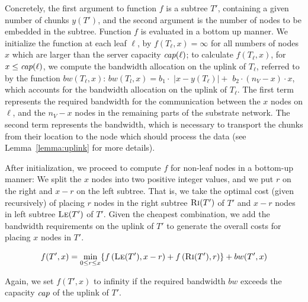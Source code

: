 \documentclass[conference,10pt]{IEEEtran}
\newcommand{\ChunkCount}{\ensuremath{y}}
\newcommand{\capacity}{\emph{cap}}
\newcommand{\Tree}{\ensuremath{T}}
\newcommand{\CostTrans}{\ensuremath{b_1}}
\newcommand{\CostCom}{\ensuremath{b_2}}
\newcommand{\Vms}{\ensuremath{n_V}}
\begin{document}
Concretely, the first argument to function $f$
is a subtree $\Tree'$, containing a given number of
chunks $\ChunkCount(\Tree')$,
and the
second argument is the number of nodes to be embedded in the subtree.
Function $f$ is evaluated in a bottom up manner. We initialize the
function at each leaf $\ell$, by $f(T_{\ell},x) =
\infty$ for all numbers of nodes $x$ which are larger than
the server capacity $\capacity(\ell)$;
to calculate $f(T_{\ell}, x)$, for $x \leq \capacity(\ell)$, we compute the
bandwidth allocation on the uplink of $T_{\ell}$, referred to by the function
$bw(T_{\ell},x)$:
$bw(T_l,x)=  \CostTrans \cdot $ $|x - \ChunkCount(T_{\ell})| +$ $ \CostCom \cdot
(\Vms - x) \cdot x$,
which accounts for the bandwidth allocation on the uplink of $T_{\ell}$. The
first
term represents the required bandwidth for the communication between the $x$
nodes on $\ell$, and the $\Vms - x$ nodes in the remaining parts of the substrate
network.
The second term represents
the bandwidth, which is necessary to transport the chunks from their location to
the node which should process the data (see Lemma~\ref{lemma:uplink} for more
details).

After initialization, we proceed to compute $f$ for non-leaf
nodes in a bottom-up manner: We split the $x$ nodes
into two positive integer
values, and we put $r$ on the right and $x - r$ on the left subtree.
That is, we take the optimal cost
(given recursively) of placing $r$ nodes in
the right subtree $\textsc{Ri}(T')$ of $T'$ and $x-r$ nodes in left subtree $\textsc{Le}(T')$ of
$T'$. Given the cheapest combination, we add the bandwidth requirements
on the uplink of $T'$ to generate the overall costs for placing $x$ nodes in $T'$.



$$f(T',x) =   \min_{0\leq r \leq x} \{  f\left(\textsc{Le}(T'),
x-r\right) +
f\left(\textsc{Ri}(T'), r\right) \} + bw(T',x)$$

Again, we set $f(T',x)$ to infinity if the required bandwidth
$bw$ exceeds the capacity $\capacity$ of the uplink of $T'$.
\end{document}
